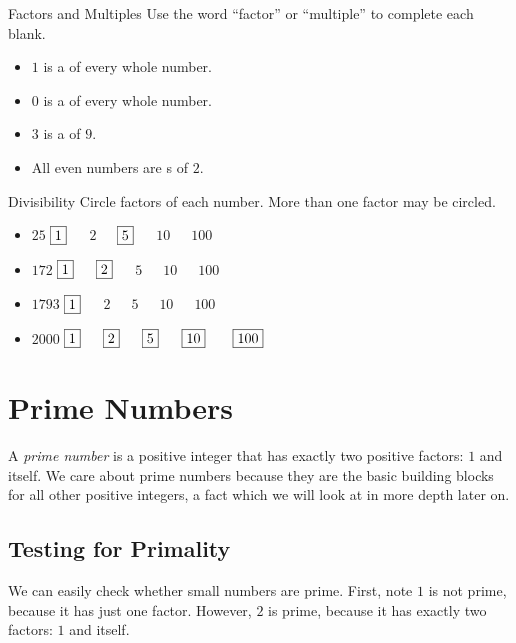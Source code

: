 \documentclass[a4paper,10pt]{report}
\begin{document}
\begin{problem}{Factors and Multiples}
 Use the word ``factor'' or ``multiple'' to complete each blank.

 \begin{itemize}
  \item \(1\) is a  of every whole number.
  \item \(0\) is a  of every whole number.
  \item \(3\) is a  of \(9\).
  \item All even numbers are s of \(2\).
 \end{itemize}
\end{problem}

\begin{problem}{Divisibility}
 Circle factors of each number. More than one factor may be circled.

 \begin{itemize}
  \item \(25\) \hfill \(\Ans{1}\)~~~\(2\)~~~\(\Ans{5}\)~~~\(10\)~~~\(100\)
  \item \(172\) \hfill \(\Ans{1}\)~~~\(\Ans{2}\)~~~\(5\)~~~\(10\)~~~\(100\)
  \item \(1793\) \hfill \(\Ans{1}\)~~~\(2\)~~~\(5\)~~~\(10\)~~~\(100\)
  \item \(2000\) \hfill \(\Ans{1}\)~~~\(\Ans{2}\)~~~\(\Ans{5}\)~~~\(\Ans{10}\)
  ~~~\(\Ans{100}\)
 \end{itemize}
\end{problem}

\chapter{Prime Numbers}

A \emph{prime number} is a positive integer that has exactly two positive
factors: \(1\) and itself. We care about prime numbers because they are the
basic building blocks for all other positive integers, a fact which we will
look at in more depth later on.

\section{Testing for Primality}

We can easily check whether small numbers are prime. First, note \(1\) is not
prime, because it has just one factor. However, \(2\) is prime, because it has
exactly two factors: \(1\) and itself.
\end{document}
